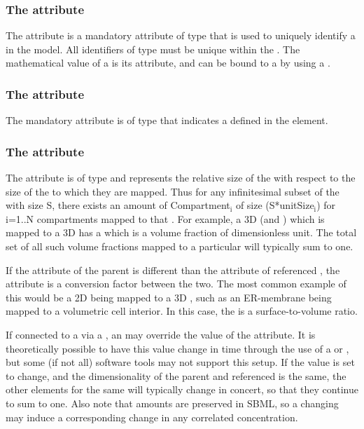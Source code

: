\subsubsection{The \fixttspace{} attribute}
The  attribute is a mandatory attribute of type  that is used to uniquely identify a \CompartmentMapping in the model.  All identifiers of type  must be unique within the \Geometry.  The mathematical value of a \CompartmentMapping is its  attribute, and can be bound to a \Parameter by using a \SpatialSymbolReference.

\subsubsection{The \fixttspace{} attribute}
The mandatory  attribute is of type  that indicates a \DomainType defined in the \Geometry element.

\subsubsection{The \fixttspace{} attribute}
The  attribute is of type  and represents the relative size of the \Compartment with respect to the size of the \Domains to which they are mapped.  Thus for any infinitesimal subset of the \Domain with size S, there exists an amount of Compartment$_{\text{i}}$ of size (S*unitSize$_{\text{i}}$) for i=1..N compartments mapped to that \DomainType.  For example, a 3D \Compartment (and \DomainType) which is mapped to a 3D \DomainType has a  which is a volume fraction of dimensionless unit.  The total set of all such volume fractions mapped to a particular \DomainType will typically sum to one. 

If the  attribute of the parent \Compartment is different than the  attribute of referenced \DomainType, the  attribute is a conversion factor between the two.  The most common example of this would be a 2D \Compartment being mapped to a 3D \DomainType, such as an ER-membrane being mapped to a volumetric cell interior.  In this case, the  is a surface-to-volume ratio.

If connected to a \Parameter via a \SpatialSymbolReference, an \InitialAssignment may override the value of the  attribute.  It is theoretically possible to have this value change in time through the use of a \Rule or \Event, but some (if not all) software tools may not support this setup.  If the value is set to change, and the dimensionality of the parent \Compartment and referenced \DomainType is the same, the other \CompartmentMapping elements for the same \DomainType will typically change in concert, so that they continue to sum to one.  Also note that \Species amounts are preserved in SBML, so a changing  may induce a corresponding change in any correlated \Species concentration.

